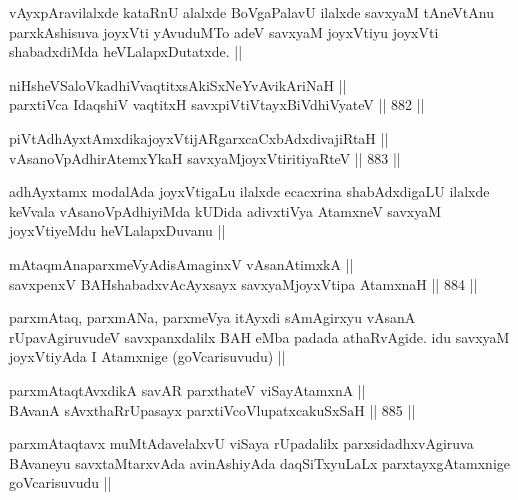 \begin{artha}
vAyxpAravilalxde kataRnU alalxde BoVgaPalavU ilalxde savxyaM tAneVtAnu parxkAshisuva joyxVti yAvuduMTo adeV savxyaM joyxVtiyu joyxVti shabadxdiMda heVLalapxDutatxde. ||
\end{artha}


\begin{shl}
niHsheVSaloVkadhiVvaqtitxsAkiSxNeYvAvikAriNaH ||  \\
parxtiVca IdaqshiV vaqtitxH savxpiVtiVtayxBiVdhiVyateV ||  882 ||  
\end{shl}

\begin{shl}
piVtAdhAyxtAmxdikajoyxVtijARgarxcaCxbAdxdivajiRtaH || \\
vAsanoVpAdhirAtemxYkaH savxyaMjoyxVtiritiyaRteV ||  883 ||  
\end{shl}

\begin{artha}
adhAyxtamx modalAda joyxVtigaLu ilalxde ecacxrina shabAdxdigaLU ilalxde keVvala vAsanoVpAdhiyiMda kUDida adivxtiVya AtamxneV savxyaM joyxVtiyeMdu heVLalapxDuvanu ||
\end{artha}


\begin{shl}
mAtaqmAnaparxmeVyAdisAmaginxV vAsanAtimxkA || \\
savxpenxV BAHshabadxvAcAyx\s sayx savxyaMjoyxVtipa AtamxnaH ||  884 ||  
\end{shl}

\begin{artha}
parxmAtaq, parxmANa, parxmeVya itAyxdi sAmAgirxyu vAsanA rUpavAgiruvudeV savxpanxdalilx BAH eMba padada athaRvAgide. idu savxyaM joyxVtiyAda I Atamxnige (goVcarisuvudu) ||
\end{artha}


\begin{shl}
parxmAtaqtAvxdikA savAR parxthateV viSayAtamxnA || \\
BAvanA sAvxthaRrUpasayx parxtiVcoV\s lupatxcakuSxSaH ||  885 ||  
\end{shl}

\begin{artha}
parxmAtaqtavx muMtAdavelalxvU viSaya rUpadalilx parxsidadhxvAgiruva BAvaneyu savxtaMtarxvAda avinAshiyAda daqSiTxyuLaLx parxtayxgAtamxnige goVcarisuvudu ||
\end{artha}

